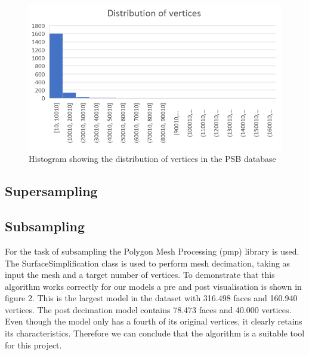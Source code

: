 \documentclass{bigdata}
\begin{document}
\begin{figure}[h!]
  \centering
    \includegraphics[width=\linewidth]{Pictures/verticesHist.png}
    \caption{Histogram showing the distribution of vertices in the PSB database}
\end{figure}

\subsection{Supersampling}

\subsection{Subsampling}
For the task of subsampling the Polygon Mesh Processing (pmp) library is used. The SurfaceSimplification class is used to perform mesh decimation, taking as input the mesh and a target number of vertices. To demonstrate that this algorithm works correctly for our models a pre and post visualisation is shown in figure 2. This is the largest model in the dataset with 316.498 faces and 160.940 vertices. The post decimation model contains 78.473 faces and 40.000 vertices. Even though the model only has a fourth of its original vertices, it clearly retains its characteristics. Therefore we can conclude that the algorithm is a suitable tool for this project.
\end{document}
